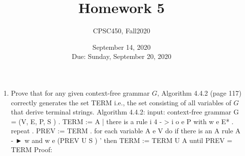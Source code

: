 \documentclass{article}
\title{Homework 5}
\author{CPSC450, Fall2020}
\date{September 14, 2020\\
Due: Sunday, September 20, 2020}
\begin{document}
\maketitle

\begin{enumerate}

\item Prove that for any given context-free grammar $G$, Algorithm
  4.4.2 (page 117) correctly generates
  the set TERM i.e., the set consisting of all variables of $G$ that
  derive terminal strings.
  \newline Algorithm 4.4.2: input: context-free grammar G = (V, E, P, S )
. TERM := {A | there is a rule i 4 - > i o e P with w e E*}
 . repeat
. PREV := TERM
. for each variable A e V do
\newline if there is an A rule A - ► w and w e (PREV U S ) ' then
\newline TERM := TERM U {A}
\newline until PREV = TERM
\newline Proof:


\end{enumerate}
\end{document}
